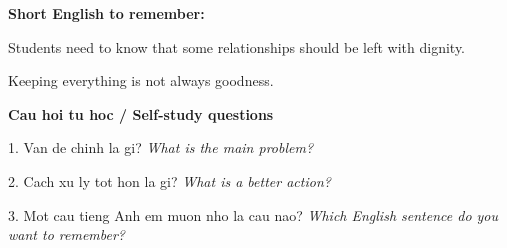 \begin{ghinhoanh}
\textbf{Short English to remember:}

Students need to know that some relationships should be left with dignity.

Keeping everything is not always goodness.

\end{ghinhoanh}

\begin{tuhocnhanh}
\textbf{Cau hoi tu hoc / Self-study questions}

1. Van de chinh la gi? \textit{What is the main problem?}

2. Cach xu ly tot hon la gi? \textit{What is a better action?}

3. Mot cau tieng Anh em muon nho la cau nao? \textit{Which English sentence do you want to remember?}
\end{tuhocnhanh}
